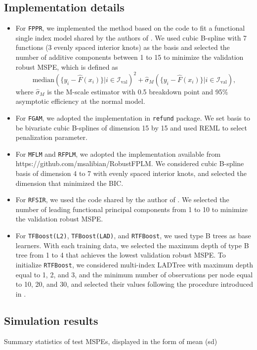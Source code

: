 \documentclass{article}
\begin{document}
\subsection{Implementation details}

\begin{itemize}
	\item For \texttt{FPPR}, we implemented the method based on the code to fit a functional single index model shared by  the authors of \cite{ferraty2013functional}.  We used cubic B-spline with 7 functions (3 evenly spaced interior knots) as the basis and selected the number of additive components between 1 to 15 to minimize the validation  robust  MSPE, which is defined as
	$$\text{median}( \{y_i - \hat{F}(x_i)\}|i \in \mathcal{I}_{\text{val}})^2 + \hat{\sigma}_M(  \{y_i - \hat{F}(x_i)\}|i \in \mathcal{I}_{\text{val}}),$$
	where $\hat{\sigma}_M$ is the M-scale estimator with 0.5 breakdown point and 95\% asymptotic efficiency at the normal model. 
	\item For \texttt{FGAM},  we adopted the implementation in \texttt{refund} package. We set basis to be bivariate cubic B-splines of dimension 15 by 15 and used REML to select penalization parameter. 
	\item For \texttt{MFLM} and \texttt{RFPLM}, we adopted the implementation available from \\ https://github.com/msalibian/RobustFPLM. We considered cubic B-spline basis of dimension 4 to 7 with evenly spaced interior knots, and selected the dimension that minimized the BIC. 
	\item For \texttt{RFSIR}, we used the code shared by the author of \cite{wang2017robust}. We selected the number of leading functional principal components from 1 to 10 to minimize the validation  robust  MSPE. 
	\item For \texttt{TFBoost(L2)},  \texttt{TFBoost(LAD)}, and  \texttt{RTFBoost}, we used type B trees as base learners. With each training data, we selected the maximum depth of type B tree from 1 to 4 that achieves the lowest validation robust MSPE. To initialize \texttt{RTFBoost}, we considered multi-index LADTree with  maximum depth equal to 1, 2, and 3, and the minimum number of observations per node equal to 10, 20, and 30, and selected their values following the procedure introduced in . 
\end{itemize}



\subsection{Simulation results}
Summary statistics of test MSPEs, displayed in the form of mean (sd)





\end{document}
